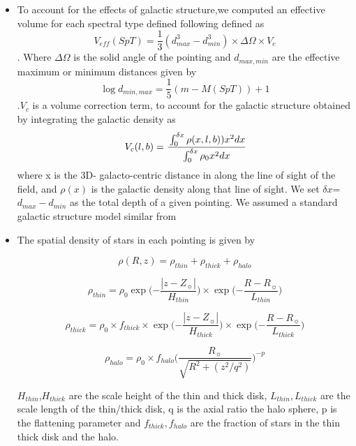 \documentclass[manuscript]{aastex}
\begin{document}
\begin{itemize}
\item To account for the effects of galactic structure,we computed an effective volume for each spectral type defined  following \cite{2007ApJ...659..655B} defined as  \begin{equation} V_{eff}(SpT)=\frac{1}{3} (d_{max}^3-d_{min}^3) \times \Delta \Omega \times V_c \end{equation}. Where $\Delta \Omega$ is the solid angle of the pointing and  $d_{max, min}$ are the effective maximum or minimum distances given by \begin{equation} \log d_{min, max} =\frac{1}{5}(m-M(SpT))+1 \end{equation}.$V_c$ is a volume correction term, to account for the galactic structure obtained by integrating the galactic density as 
\begin{equation}
V_c (l, b)=\cfrac{\int _{0} ^{\delta x} \rho (x, l, b))  x^2 dx}{\int  _{0} ^{\delta x} \rho_0  x^2 dx}
\end{equation} where x is the 3D- galacto-centric distance in along the line of sight of the field, and  $\rho (x)$ is the galactic density along that line of sight. We set $\delta x$= $d_{max}-d_{min}$ as the total depth of a given pointing. We assumed a standard galactic structure model similar from \cite{2008ApJ...673..864J}
\item The spatial density of stars in each pointing is given by 

\begin{equation}
\rho (R, z)= \rho _{thin} + \rho_{thick} + \rho_{halo}
\end{equation}

\begin{equation}
 \rho _{thin}= \rho _0 \exp \biggl( {-\frac{|z-Z_\sun|}{H_{thin}}} \biggl) \times \exp \biggl( {-\frac{R-R_\sun}{L_{thin}}} \biggl)
\end{equation}

\begin{equation}
 \rho _{thick}= \rho _0 \times f_{thick}\times \exp \biggl( {-\frac{|z-Z_\sun|}{H_{thick}}} \biggl) \times \exp \biggl( {-\frac{R-R_\sun}{L_{thick}}} \biggl)
\end{equation}

\begin{equation}
 \rho _{halo}= \rho _0 \times    f _{halo} \biggl(\frac{R_\sun}{\sqrt{R^2+(z^2/q^2)}} \biggl)^{-p}
 \end{equation}
 

$H_{thin}$,$H_{thick}$ are the scale height of the thin and thick disk, $L_{thin}, L_{thick}$ are the scale length of the thin/thick disk, q is the axial ratio the halo sphere, p is the flattening parameter and $f _{thick}, f _{halo}$  are the fraction of stars in the thin thick disk and the halo.


\end{itemize}
\end{document}
